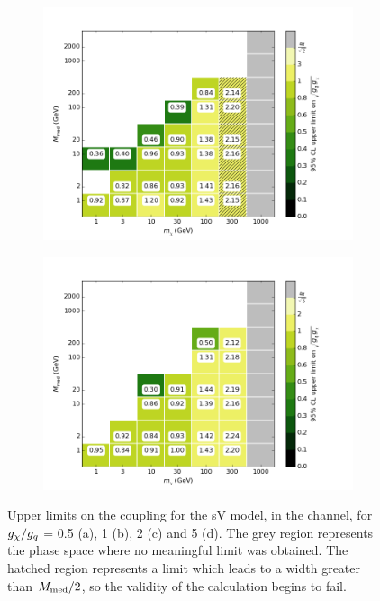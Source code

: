 \begin{figure}[h]
\begin{subfigure}[t]{0.45\textwidth}
      \caption{}
    \end{subfigure}
    \begin{subfigure}[t]{0.45\textwidth}
      \centering
      \includegraphics[width=1.\textwidth]{figures/grid_allpoints_SVD_rat2.png}
      \caption{}
    \end{subfigure}
    \begin{subfigure}[t]{0.45\textwidth}
      \centering
      \includegraphics[width=1.\textwidth]{figures/grid_allpoints_SVD_rat5.png}
      \caption{}
    \end{subfigure}
    \caption{Upper limits on the coupling for the sV model, in the \monoZ channel, for $g_{\chi} / g_q$ = 0.5 (a), 1 (b), 2 (c) and 5 (d). The grey region represents the phase space where no meaningful limit was obtained. The hatched region represents a limit which leads to a width greater than $M_{\mathrm{med}} / 2$, so the validity of the calculation begins to fail.}
    \label{fig:MonoZ_SVD_couplinglimit}
\end{figure}

